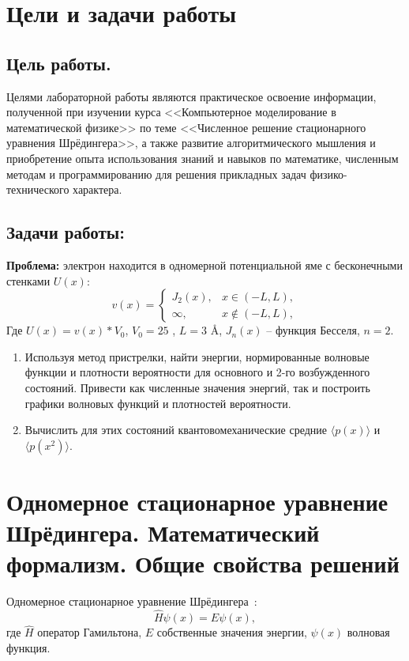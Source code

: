 \documentclass[a4paper,12pt]{article}
\begin{document}
\newpage
\tableofcontents
\pagestyle{plain}
\setcounter{page}{2}

\newpage
\section{Цели и задачи работы}\label{sec:goals}
\subsection{Цель работы.}\label{subsec:-.}
Целями лабораторной работы являются практическое освоение информации, полученной при изучении курса <<Компьютерное моделирование в математической физике>> по теме <<Численное решение стационарного уравнения Шрёдингера>>, а также развитие алгоритмического мышления и приобретение опыта использования знаний и навыков по математике, численным методам и программированию для решения прикладных задач физико-технического характера.

\subsection{Задачи работы:}\label{subsec:-:}

\textbf{Проблема:} электрон находится в одномерной потенциальной яме с бесконечными стенками $U(x)$:
\[
v(x) =
    \begin{cases}
        J_2(x), & x \in (-L, L), \\
        \infty, & x \notin (-L, L),
    \end{cases}
\]
Где $U(x) = v(x)*V_0$, $V_0 = 25$ , $L = 3$ \AA, $J_n(x)$ -- функция Бесселя, $n = 2$.

\begin{enumerate}
    \item Используя метод пристрелки, найти энергии, нормированные волновые функции и плотности вероятности для основного и 2-го возбужденного состояний.
          Привести как численные значения энергий, так и построить графики волновых функций и плотностей вероятности.
    \item Вычислить для этих состояний квантовомеханические средние $\langle p(x) \rangle$ и $ \langle p(x^2) \rangle $.
\end{enumerate}

\newpage
\section{Одномерное стационарное уравнение Шрёдингера. Математический формализм. Общие свойства решений}\label{sec:-}
Одномерное стационарное уравнение Шрёдингера~\cite{tim}:
\begin{equation}
    \hat{H}\psi(x) = E\psi(x),
    \label{eq:oneDimShrodingerEq}
\end{equation}
где $\hat{H}$ \textendash{} оператор Гамильтона, $E$ \textendash{} собственные значения энергии, $\psi(x)$ \textendash{} волновая функция.
\end{document}
